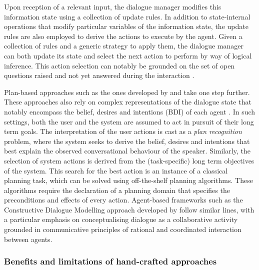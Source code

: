 Upon reception of a relevant input, the dialogue manager modifies this information state using a collection of update rules. In addition to state-internal operations that modify particular variables of the information state, the update rules are also employed to derive the actions to execute by the agent.  Given a collection of rules and a generic strategy to apply them, the dialogue manager can both update its state and select the next action to perform by way of logical inference. This action selection can notably be grounded on the set of open questions raised and not yet answered during the interaction \citep{larsson2002,Ginzburg2012}.  

Plan-based approaches such as the ones developed by \cite{Freedman:2000} and \cite{Allen:2001} take one step further. These approaches also rely on complex representations of the dialogue state that notably encompass the belief, desires and intentions (BDI) of each agent \citep{Cohen1979,Allen1980}.  In such settings, both the user and the system are assumed to act in pursuit of their long term goals.  The interpretation of the user actions is cast as a \textit{plan recognition} problem, where the system seeks to derive the belief, desires and intentions that best explain the observed conversational behaviour of the speaker.  Similarly, the selection of system actions is derived from the (task-specific) long term objectives of the system. This search for the best action is an instance of a classical planning task, which can be solved using off-the-shelf planning algorithms. These algorithms require the declaration of a planning domain that specifies the preconditions and effects of every action. Agent-based frameworks such as the Constructive Dialogue Modelling approach developed by \cite{Jokinen:2009} follow similar lines, with a particular emphasis on conceptualising dialogue as a collaborative activity grounded in communicative principles of rational and coordinated interaction between agents. 

\subsubsection*{Benefits and limitations of hand-crafted approaches}

